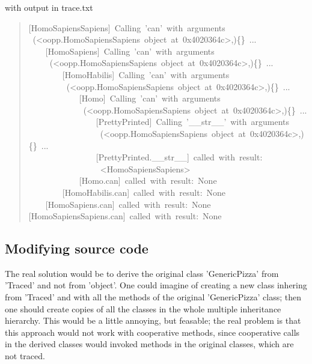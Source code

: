 \documentclass[10pt,english]{article}
\begin{document}
with output in trace.txt
\begin{quote}
\begin{ttfamily}\begin{flushleft}
\mbox{[HomoSapiensSapiens]~Calling~'can'~with~arguments}\\
\mbox{~(<oopp.HomoSapiensSapiens~object~at~0x4020364c>,){\{}{\}}~...}\\
\mbox{~~~~[HomoSapiens]~Calling~'can'~with~arguments}\\
\mbox{~~~~~(<oopp.HomoSapiensSapiens~object~at~0x4020364c>,){\{}{\}}~...}\\
\mbox{~~~~~~~~[HomoHabilis]~Calling~'can'~with~arguments}\\
\mbox{~~~~~~~~~(<oopp.HomoSapiensSapiens~object~at~0x4020364c>,){\{}{\}}~...}\\
\mbox{~~~~~~~~~~~~[Homo]~Calling~'can'~with~arguments}\\
\mbox{~~~~~~~~~~~~~(<oopp.HomoSapiensSapiens~object~at~0x4020364c>,){\{}{\}}~...}\\
\mbox{~~~~~~~~~~~~~~~~[PrettyPrinted]~Calling~'{\_}{\_}str{\_}{\_}'~with~arguments}\\
\mbox{~~~~~~~~~~~~~~~~~(<oopp.HomoSapiensSapiens~object~at~0x4020364c>,){\{}{\}}~...}\\
\mbox{~~~~~~~~~~~~~~~~[PrettyPrinted.{\_}{\_}str{\_}{\_}]~called~with~result:~}\\
\mbox{~~~~~~~~~~~~~~~~~<HomoSapiensSapiens>}\\
\mbox{~~~~~~~~~~~~[Homo.can]~called~with~result:~None}\\
\mbox{~~~~~~~~[HomoHabilis.can]~called~with~result:~None}\\
\mbox{~~~~[HomoSapiens.can]~called~with~result:~None}\\
\mbox{[HomoSapiensSapiens.can]~called~with~result:~None}
\end{flushleft}\end{ttfamily}
\end{quote}



\hypertarget{modifying-source-code}{}
\subsection*{Modifying source code}

The real solution would be to derive the original class 'GenericPizza'
from 'Traced' and not from 'object'. One could imagine of creating
a new class inhering from 'Traced' and with all the methods of the
original 'GenericPizza' class; then one should create copies of
all the classes in the whole multiple inheritance hierarchy.
This would be a little annoying, but feasable; the real problem is
that this approach would not work with cooperative methods, since 
cooperative calls in the derived classes would invoked methods in 
the original classes, which are not traced.
\end{document}
